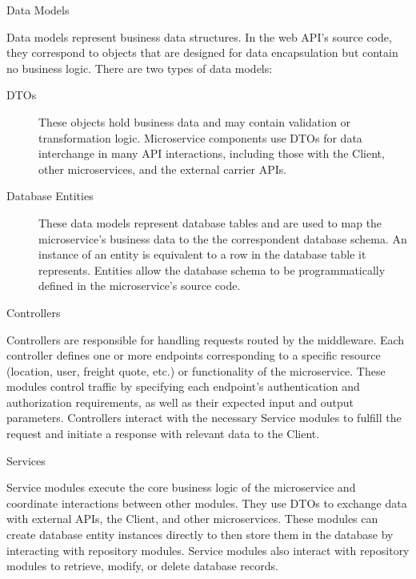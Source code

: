 \documentclass[12pt, reqno, oneside]{amsbook}
\makeatletter
\def\subsection{\@startsection{subsection}{2}%
      \z@{.5\linespacing\@plus.7\linespacing}{.25\linespacing}%
      {\normalfont\bfseries\flushleft}}
\theoremstyle{definition}
\theoremstyle{definition}
\numberwithin{section}{chapter}
\numberwithin{table}{chapter}
\numberwithin{figure}{chapter}
\makeatother
\begin{document}
\subsection{Data Models}

Data models represent business data structures. In the web \ac{API}'s source code, they correspond to objects that are designed for data encapsulation but contain no business logic. There are two types of data models:

\begin{description}
  \item[\acp{DTO}] These objects hold business data and may contain validation or transformation logic. Microservice components use \acp{DTO} for data interchange in many \ac{API} interactions, including those with the Client, other microservices, and the external carrier \acp{API}.
  \item[Database Entities] These data models represent database tables and are used to map the microservice's business data to the the correspondent database schema. An instance of an entity is equivalent to a row in the database table it represents. Entities allow the database schema to be programmatically defined in the microservice's source code.
\end{description}

\subsection{Controllers}

Controllers are responsible for handling requests routed by the middleware. Each controller defines one or more endpoints corresponding to a specific resource (location, user, freight quote, etc.) or functionality of the microservice. These modules control traffic by specifying each endpoint's authentication and authorization requirements, as well as their expected input and output parameters. Controllers interact with the necessary Service modules to fulfill the request and initiate a response with relevant data to the Client.

\subsection{Services}

Service modules execute the core business logic of the microservice and coordinate interactions between other modules. They use \acp{DTO} to exchange data with external \acp{API}, the Client, and other microservices. These modules can create database entity instances directly to then store them in the database by interacting with repository modules. Service modules also interact with repository modules to retrieve, modify, or delete database records.
\end{document}
